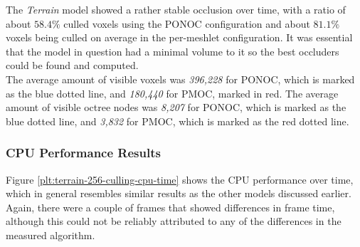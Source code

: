 
\noindent
The \emph{Terrain} model showed a rather stable occlusion over time, with a ratio of about $58.4\%$ culled voxels 
using the \ac{PONOC} configuration and about $81.1\%$ voxels being culled on average in the per-meshlet 
configuration. It was essential that the model in question had a minimal volume to it so the best occluders could 
be found and computed. \\

\noindent
The average amount of visible voxels was \emph{396,228} for \ac{PONOC}, which is marked as the 
blue dotted line, and \emph{180,440} for \ac{PMOC}, marked in red. The average amount of 
visible octree nodes was \emph{8,207} for \ac{PONOC}, which is marked as the blue dotted line, 
and \emph{3,832} for \ac{PMOC}, which is marked as the red dotted line.

\subsubsection*{CPU Performance Results} \label{subsubsec-cpu-performance-results-terrain}

Figure \ref{plt:terrain-256-culling-cpu-time} shows the \ac{CPU} performance over time, which in general 
resembles similar results as the other models discussed earlier. Again, there were a couple of frames that 
showed differences in frame time, although this could not be reliably attributed to any of the differences in 
the measured algorithm. 

